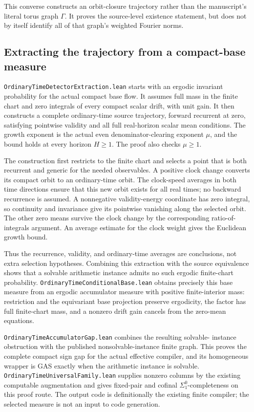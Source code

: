 \documentclass[11pt]{article}
\newcommand{\code}[1]{{\small\nolinkurl{#1}}}
\begin{document}
This converse constructs an orbit-closure trajectory rather than the
manuscript's literal torus graph $\Gamma$. It proves the source-level
existence statement, but does not by itself identify all of that graph's
weighted Fourier norms.

\subsection{Extracting the trajectory from a compact-base measure}

\code{OrdinaryTimeDetectorExtraction.lean} starts with an ergodic invariant
probability for the actual compact base flow. It assumes full mass in the
finite chart and zero integrals of every compact scalar drift, with unit
gain. It then constructs a complete ordinary-time source trajectory,
forward recurrent at zero, satisfying pointwise validity and all full
real-horizon scalar mean conditions. The growth exponent is the actual
even denominator-clearing exponent $\mu$, and the bound holds at every
horizon $H\ge1$. The proof also checks $\mu\ge1$.

The construction first restricts to the finite chart and selects a point
that is both recurrent and generic for the needed observables. A positive
clock change converts its compact orbit to an ordinary-time orbit. The
clock-speed averages in both time directions ensure that this new orbit
exists for all real times; no backward recurrence is assumed. A
nonnegative validity-energy coordinate has zero integral, so continuity
and invariance give its pointwise vanishing along the selected orbit.
The other zero means survive the clock change by the corresponding
ratio-of-integrals argument. An average estimate for the clock weight
gives the Euclidean growth bound.

Thus the recurrence, validity, and ordinary-time averages are conclusions,
not extra selection hypotheses. Combining this extraction with the source
equivalence shows that a solvable arithmetic instance admits no such
ergodic finite-chart probability. \code{OrdinaryTimeConditionalBase.lean}
obtains precisely this base measure from an ergodic accumulator measure
with positive finite-interior mass: restriction and the equivariant base
projection preserve ergodicity, the factor has full finite-chart mass,
and a nonzero drift gain cancels from the zero-mean equations.

\code{OrdinaryTimeAccumulatorGap.lean} combines the resulting solvable-
instance obstruction with the published nonsolvable-instance finite graph.
This proves the complete compact sign gap for the actual effective compiler,
and its homogeneous wrapper is GAS exactly when the arithmetic instance
is solvable. \code{OrdinaryTimeUniversalFamily.lean} supplies nonzero
columns by the existing computable augmentation and gives fixed-pair and
cofinal $\Sigma^0_1$-completeness on this proof route. The output code is
definitionally the existing finite compiler; the selected measure is not
an input to code generation.
\end{document}
